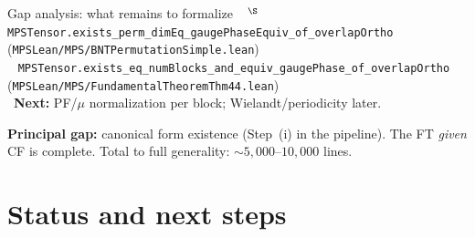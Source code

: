 \documentclass[aspectratio=169,10pt]{beamer}
\begin{document}
\begin{frame}{Gap analysis: what remains to formalize}
{{        %
        \textcolor{leangreen}{\checkmark}~%
          $^{\S}$\,\texttt{MPSTensor.exists\_perm\_dimEq\_gaugePhaseEquiv\_of\_overlapOrtho}\\
          \quad(\texttt{MPSLean/MPS/BNTPermutationSimple.lean})~\cite{Cirac2021Matrix}\\[0.15em]
        \textcolor{leangreen}{\checkmark}~%
          \texttt{MPSTensor.exists\_eq\_numBlocks\_and\_equiv\_gaugePhase\_of\_overlapOrtho}\\
          \quad(\texttt{MPSLean/MPS/FundamentalTheoremThm44.lean})~\cite{Cirac2021Matrix}\\[0.15em]
        \textcolor{amber}{\textbullet}~\textbf{Next:} PF/$\mu$ normalization per block;
          Wielandt/periodicity later.
    }}

    \vspace{0.05em}
    \textcolor{dimwhite}{\footnotesize
    \textbf{Principal gap:} canonical form existence (Step~(i) in the pipeline).
    The FT \emph{given} CF is complete.
    Total to full generality: ${\sim}5{,}000$--$10{,}000$ lines.}
\end{frame}

\section{Status and next steps}
\end{document}
